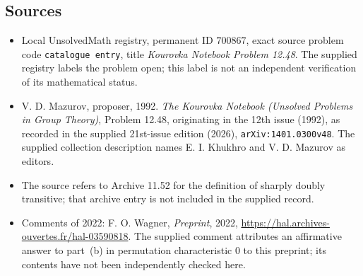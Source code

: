 \documentclass[11pt]{article}
\begin{document}
\subsection{Sources}
\begin{itemize}
\item Local UnsolvedMath registry, permanent ID \(700867\), exact source problem code \texttt{catalogue entry}, title \emph{Kourovka Notebook Problem 12.48}. The supplied registry labels the problem open; this label is not an independent verification of its mathematical status.
\item V. D. Mazurov, proposer, 1992. \emph{The Kourovka Notebook (Unsolved Problems in Group Theory)}, Problem 12.48, originating in the 12th issue (1992), as recorded in the supplied 21st-issue edition (2026), \texttt{arXiv:1401.0300v48}. The supplied collection description names E. I. Khukhro and V. D. Mazurov as editors.
\item The source refers to Archive 11.52 for the definition of sharply doubly transitive; that archive entry is not included in the supplied record.
\item Comments of 2022: F. O. Wagner, \emph{Preprint}, 2022, \url{https://hal.archives-ouvertes.fr/hal-03590818}. The supplied comment attributes an affirmative answer to part~(b) in permutation characteristic \(0\) to this preprint; its contents have not been independently checked here.
\end{itemize}
\end{document}
